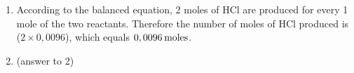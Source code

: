 {\begin{mdframed}[linewidth=4, leftmargin=40, rightmargin=40]
\begin{exercise}
\begin{enumerate}[noitemsep, label=\textbf{Step} \textbf{\arabic*}. ]
      
      \label{m38717*id279505}(answer to 1)\par 
      \item  
      \label{m38717*id279513}According to the balanced equation, 2 moles of \begin{math}\mathrm{HCl}\end{math} are produced for every 1 mole of the two reactants. Therefore the number of moles of \begin{math}\mathrm{HCl}\end{math} produced is (\begin{math}2\ensuremath{\times}0,0096\end{math}), which equals \begin{math}0,0096\phantom{\rule{2pt}{0ex}}\mathrm{moles}\end{math}.\par 
      \item  
      \label{m38717*id279531}\nopagebreak\noindent{}
    
      
      \label{m38717*id279580}(answer to 2)\par 
\end{enumerate}
         

    \end{exercise}
    \end{mdframed}
    }
    \noindent
  
